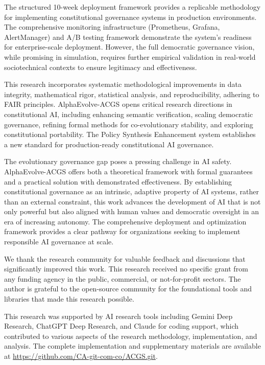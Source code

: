 \documentclass[manuscript,screen,9pt]{acmart}
\begin{document}
The structured 10-week deployment framework provides a replicable methodology for implementing constitutional governance systems in production environments. The comprehensive monitoring infrastructure (Prometheus, Grafana, AlertManager) and A/B testing framework demonstrate the system's readiness for enterprise-scale deployment. However, the full democratic governance vision, while promising in simulation, requires further empirical validation in real-world sociotechnical contexts to ensure legitimacy and effectiveness.

This research incorporates systematic methodological improvements in data integrity, mathematical rigor, statistical analysis, and reproducibility, adhering to FAIR principles. AlphaEvolve-ACGS opens critical research directions in constitutional AI, including enhancing semantic verification, scaling democratic governance, refining formal methods for co-evolutionary stability, and exploring constitutional portability. The Policy Synthesis Enhancement system establishes a new standard for production-ready constitutional AI governance.

The evolutionary governance gap poses a pressing challenge in AI safety. AlphaEvolve-ACGS offers both a theoretical framework with formal guarantees and a practical solution with demonstrated effectiveness. By establishing constitutional governance as an intrinsic, adaptive property of AI systems, rather than an external constraint, this work advances the development of AI that is not only powerful but also aligned with human values and democratic oversight in an era of increasing autonomy. The comprehensive deployment and optimization framework provides a clear pathway for organizations seeking to implement responsible AI governance at scale.

\begin{acks}
We thank the research community for valuable feedback and discussions that significantly improved this work. This research received no specific grant from any funding agency in the public, commercial, or not-for-profit sectors. The author is grateful to the open-source community for the foundational tools and libraries that made this research possible.

This research was supported by AI research tools including Gemini Deep Research, ChatGPT Deep Research, and Claude for coding support, which contributed to various aspects of the research methodology, implementation, and analysis. The complete implementation and supplementary materials are available at \url{https://github.com/CA-git-com-co/ACGS.git}.
\end{acks}
\end{document}
